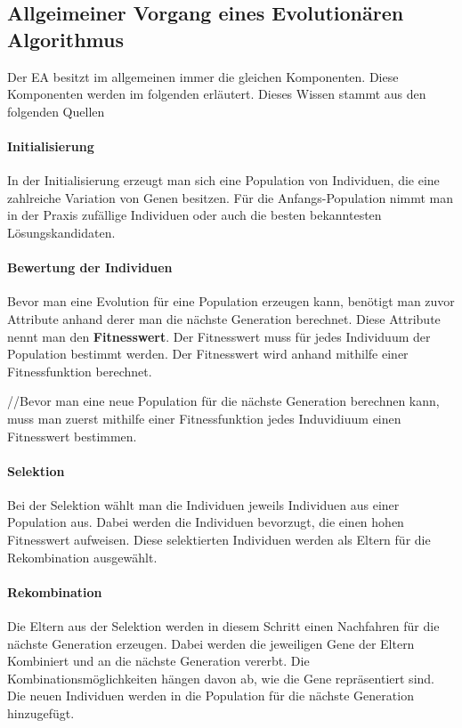 \subsection{Allgeimeiner Vorgang eines Evolution{\"a}ren Algorithmus}
Der EA besitzt im allgemeinen immer die gleichen Komponenten. Diese Komponenten werden im folgenden erl{\"a}utert. Dieses Wissen stammt aus den folgenden Quellen \cite{shiffman2012nature, flickevolutionare, weicker2015evolutionare}

\paragraph*{Initialisierung}
In der Initialisierung erzeugt man sich eine Population von Individuen, die eine zahlreiche Variation von Genen besitzen. F{\"u}r die Anfangs-Population nimmt man in der Praxis zuf{\"a}llige Individuen oder auch die besten bekanntesten L{\"o}sungskandidaten.

\paragraph*{Bewertung der Individuen}
Bevor man eine Evolution f{\"u}r eine Population erzeugen kann, ben{\"o}tigt man zuvor Attribute anhand derer man die n{\"a}chste Generation berechnet. 
Diese Attribute nennt man den \textbf{Fitnesswert}. Der Fitnesswert muss f{\"u}r jedes Individuum der Population bestimmt werden. Der Fitnesswert wird anhand mithilfe einer Fitnessfunktion berechnet. 

//Bevor man eine neue Population f{\"u}r die n{\"a}chste Generation berechnen kann, muss man zuerst mithilfe einer Fitnessfunktion jedes Induvidiuum einen Fitnesswert bestimmen. 

\paragraph*{Selektion}
Bei der Selektion w{\"a}hlt man die Individuen jeweils Individuen aus einer Population aus. Dabei werden die Individuen bevorzugt, die einen hohen  Fitnesswert aufweisen. Diese selektierten Individuen werden als Eltern f{\"u}r die Rekombination ausgew{\"a}hlt.

\paragraph*{Rekombination}
Die Eltern aus der Selektion werden in diesem Schritt einen Nachfahren f{\"u}r die n{\"a}chste Generation erzeugen. Dabei werden die jeweiligen Gene der Eltern Kombiniert und an die n{\"a}chste Generation vererbt. Die Kombinationsm{\"o}glichkeiten h{\"a}ngen davon ab, wie die Gene repr{\"a}sentiert sind.
Die neuen Individuen werden in die Population f{\"u}r die n{\"a}chste Generation hinzugef{\"u}gt.


